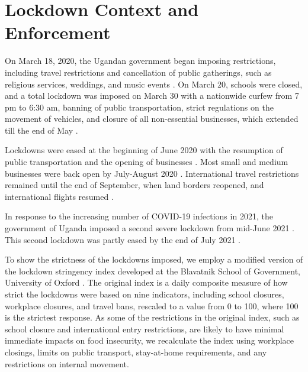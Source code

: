 \documentclass{wber}
\begin{document}
\section{Lockdown Context and Enforcement}\label{lockdown-context-and-enforcement}

On March 18, 2020, the Ugandan government began imposing restrictions,
including travel restrictions and cancellation of public gatherings,
such as religious services, weddings, and music events
\citep{Uganda-Bureau-of-Statistics2022}. On March 20, schools were
closed, and a total lockdown was imposed on March 30 with a nationwide
curfew from 7 pm to 6:30 am, banning of public transportation, strict
regulations on the movement of vehicles, and closure of all
non-essential businesses, which extended till the end of May
\citep{Alfonsi2021, Margini2020}.

Lockdowns were eased at the beginning of June 2020 with the resumption
of public transportation and the opening of businesses
\citep{Guloba2021, Monitor2020, Schwartz2021, Wagner2022}. Most small
and medium businesses were back open by July-August 2020
\citep{Alfonsi2021}. International travel restrictions remained until
the end of September, when land borders reopened, and international
flights resumed \citep{Guloba2021}.

In response to the increasing number of COVID-19 infections in 2021, the
government of Uganda imposed a second severe lockdown from mid-June 2021
\citep{Atamanov2022, Athumani2021}. This second lockdown was partly
eased by the end of July 2021 \citep{Biryabarema2021}.

To show the strictness of the lockdowns imposed, we employ a modified
version of the lockdown stringency index developed at the Blavatnik
School of Government, University of Oxford \citep{Hale2021}. The
original index is a daily composite measure of how strict the lockdowns
were based on nine indicators, including school closures, workplace
closures, and travel bans, rescaled to a value from 0 to 100, where 100
is the strictest response. As some of the restrictions in the original
index, such as school closure and international entry restrictions, are
likely to have minimal immediate impacts on food insecurity, we
recalculate the index using workplace closings, limits on public
transport, stay-at-home requirements, and any restrictions on internal
movement.
\end{document}
